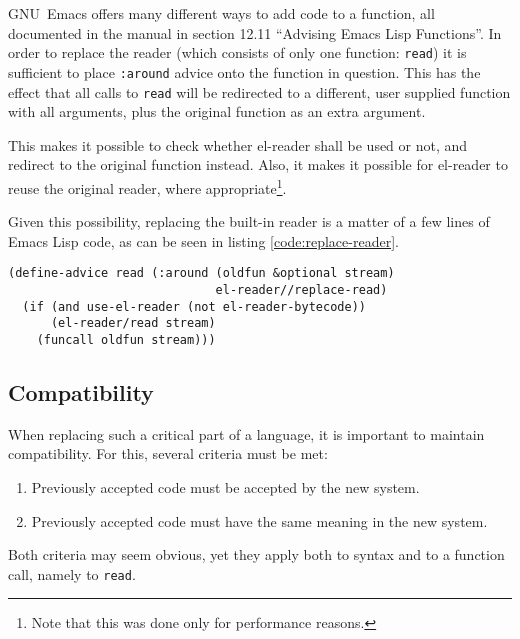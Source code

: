 \documentclass[a4paper,10pt,twoside]{article}
\newcommand{\el}{Emacs Lisp}
\newcommand{\elr}{el-reader}
\newcommand{\sym}[1]{\texttt{#1}}
\newcommand{\fun}[1]{\texttt{#1}}
\newcommand{\emacs}{GNU~Emacs}
\newcommand{\Read}{\fun{read}}
\begin{document}
\emacs{} offers many different ways to add code to a function, all documented in
the manual in section 12.11 ``Advising Emacs Lisp
Functions''\cite{elisp-reference}.  In order to replace the reader (which
consists of only one function: \fun{read}) it is sufficient to place
\sym{:around} advice onto the function in question.  This has the effect that
all calls to \fun{read} will be redirected to a different, user supplied
function with all arguments, plus the original function as an extra argument.

This makes it possible to check whether \elr{} shall be used or not, and
redirect to the original function instead.  Also, it makes it possible for
\elr{} to reuse the original reader, where appropriate\footnote{Note that this
  was done only for performance reasons.}.

Given this possibility, replacing the built-in reader is a matter of a few lines
of \el{} code, as can be seen in listing \ref{code:replace-reader}.

\begin{lstlisting}[style=lispcode,caption={Replacing the built-in
    reader},label={code:replace-reader}]
(define-advice read (:around (oldfun &optional stream)
                             el-reader//replace-read)
  (if (and use-el-reader (not el-reader-bytecode))
      (el-reader/read stream)
    (funcall oldfun stream)))
\end{lstlisting}

\subsection{Compatibility}
\label{subsec:compat}

When replacing such a critical part of a language, it is important to maintain
compatibility.  For this, several criteria must be met:

\begin{enumerate}
\item Previously accepted code must be accepted by the new system.
\item Previously accepted code must have the same meaning in the new system.
\end{enumerate}

Both criteria may seem obvious, yet they apply both to syntax and to a function
call, namely to \Read{}.
\end{document}
